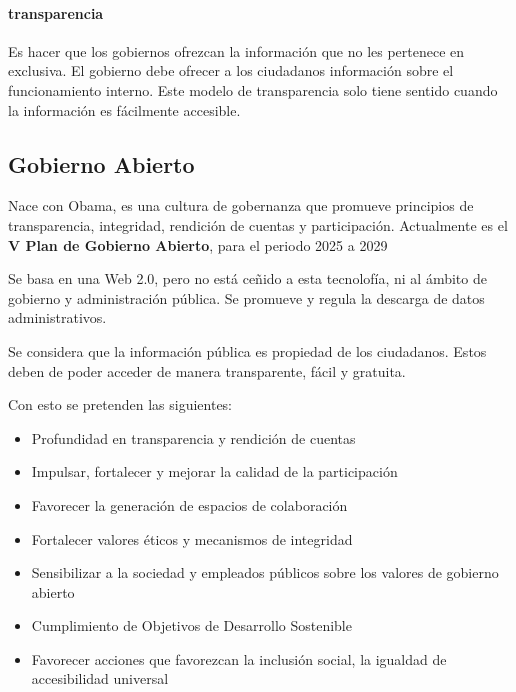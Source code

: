     \paragraph{transparencia}
        Es hacer que los gobiernos ofrezcan la información que no les pertenece en exclusiva. El gobierno debe ofrecer a los ciudadanos información sobre el funcionamiento interno. Este modelo de transparencia solo tiene sentido cuando la información es fácilmente accesible.

\subsection{Gobierno Abierto}
    Nace con Obama, es una cultura de gobernanza que promueve principios de transparencia, integridad, rendición de cuentas y participación. Actualmente es el \textbf{V Plan de Gobierno Abierto}, para el periodo 2025 a 2029

    Se basa en una Web 2.0, pero no está ceñido a esta tecnolofía, ni al ámbito de gobierno y administración pública. Se promueve y regula la descarga de datos administrativos.

    Se considera que la información pública es propiedad de los ciudadanos. Estos deben de poder acceder de manera transparente, fácil y gratuita.

    Con esto se pretenden las siguientes:
    \begin{itemize}
        \item Profundidad en transparencia y rendición de cuentas
        \item Impulsar, fortalecer y mejorar la calidad de la participación
        \item Favorecer la generación de espacios de colaboración
        \item Fortalecer valores éticos y mecanismos de integridad
        \item Sensibilizar a la sociedad y empleados públicos sobre los valores de gobierno abierto
        \item Cumplimiento de Objetivos de Desarrollo Sostenible
        \item Favorecer acciones que favorezcan la inclusión social, la igualdad de accesibilidad universal
    \end{itemize}

    \noindent{}

